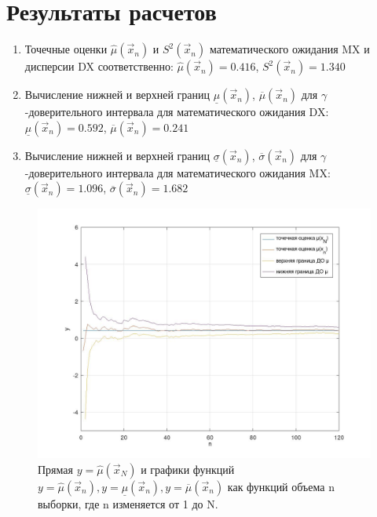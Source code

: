 \chapter{Результаты расчетов}
\begin{enumerate}
	\item Точечные оценки $\hat \mu (\vec x_n)$ и $ S^2 (\vec x_n)$ математического ожидания MX и дисперсии DX соответственно: $\hat \mu (\vec x_n) = 0.416$, $ S^2 (\vec x_n) = 1.340$
	\item Вычисление нижней и верхней границ $\underline \mu (\vec x_n)$, $\overline \mu (\vec x_n)$ для $\gamma$-доверительного интервала для математического ожидания DX: $\underline \mu (\vec x_n) = 0.592$, $\overline\mu (\vec x_n) = 0.241$
	
	\item Вычисление нижней и верхней границ $\underline \sigma (\vec x_n)$, $\overline \sigma (\vec x_n)$ для $\gamma$-доверительного интервала для математического ожидания MX: $\underline \sigma (\vec x_n) = 1.096$, $\overline \sigma (\vec x_n) = 1.682$
\end{enumerate}
%
\begin{figure}[H]
		\centering
		\includegraphics[scale=0.4]{assets/g-1.jpg}
		\caption{Прямая $y=\hat \mu (\vec x_N)$ и графики функций $y=\hat \mu (\vec x_n), y= \underline \mu (\vec x_n), y =\overline \mu (\vec x_n)$ как функций объема n выборки, где n изменяется от 1 до N.}
\end{figure}
%
